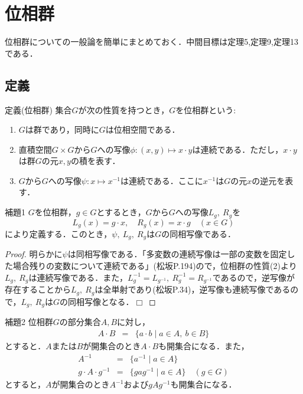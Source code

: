 \documentclass[a4paper,11pt]{jsarticle}
\newtheorem{proof}{証明}
\def\qed{\hfill $\Box$}
\begin{document}
\section{位相群}
位相群についての一般論を簡単にまとめておく．中間目標は定理5,定理9,定理13である．
\subsection{定義}
\begin{itembox}[l]{定義(位相群)}
集合$G$が次の性質を持つとき，$G$を位相群という:
\vspace{-0.7zh}%
\begin{enumerate}
\renewcommand{\labelenumi}{(\arabic{enumi})}
\item $G$は群であり，同時に$G$は位相空間である．
\item 直積空間$G\times G$から$G$への写像$\phi:(x,y)\mapsto x\cdot y$は連続である．ただし，$x\cdot y$は群$G$の元$x,y$の積を表す．
\item $G$から$G$への写像$\psi:x\mapsto x^{-1}$は連続である．ここに$x^{-1}$は$G$の元$x$の逆元を表す．
\end{enumerate}
\end{itembox}
%
%
%
\begin{itembox}[l]{補題1}
$G$を位相群，$g\in G$とするとき，$G$から$G$への写像$L_g,{\ }R_g$を
\begin{equation*}
L_g(x)=g\cdot x, \quad R_g(x)=x\cdot g \quad (x\in G)
\end{equation*}
により定義する．このとき，$\psi,{\ }L_g,{\ }R_g$は$G$の同相写像である．
\end{itembox}
\vspace{-1zh}%
\vspace{-1zh}%
\begin{proof}
明らかに$\psi$は同相写像である．「多変数の連続写像は一部の変数を固定した場合残りの変数について連続である」(松坂P.194)ので，位相群の性質(2)より$L_g,{\ }R_g$は連続写像である．また，$L_g^{-1}=L_{g^{-1}},{\ }R_g^{-1}=R_{g^{-1}}$であるので，逆写像が存在することから$L_g,{\ }R_g$は全単射であり(松坂P.34)，逆写像も連続写像であるので，$L_g,{\ }R_g$は$G$の同相写像となる．\qed
\end{proof}
%
%
%
\begin{itembox}[l]{補題2}
位相群$G$の部分集合$A,B$に対し，
\begin{eqnarray*}
A\cdot B&=&\{a\cdot b \mid a\in A,{\ }b\in B\}
\end{eqnarray*}
とすると．$A$または$B$が開集合のとき$A\cdot B$も開集合になる．また，
\begin{eqnarray*}
A^{-1}&=&\{a^{-1} \mid a\in A\} \\
g\cdot A\cdot g^{-1}&=&\{gag^{-1} \mid a\in A\} \quad (g\in G)
\end{eqnarray*}
とすると，$A$が開集合のとき$A^{-1}$および$gAg^{-1}$も開集合になる．
\end{itembox}
\end{document}
